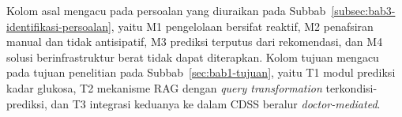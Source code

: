 \noindent\tabnotestyle Kolom asal mengacu pada persoalan yang diuraikan pada Subbab~\ref{subsec:bab3-identifikasi-persoalan}, yaitu M1 pengelolaan bersifat reaktif, M2 penafsiran manual dan tidak antisipatif, M3 prediksi terputus dari rekomendasi, dan M4 solusi berinfrastruktur berat tidak dapat diterapkan. Kolom tujuan mengacu pada tujuan penelitian pada Subbab~\ref{sec:bab1-tujuan}, yaitu T1 modul prediksi kadar glukosa, T2 mekanisme RAG dengan \emph{query transformation} terkondisi-prediksi, dan T3 integrasi keduanya ke dalam CDSS beralur \emph{doctor-mediated}.\normalsize
\endgroup
